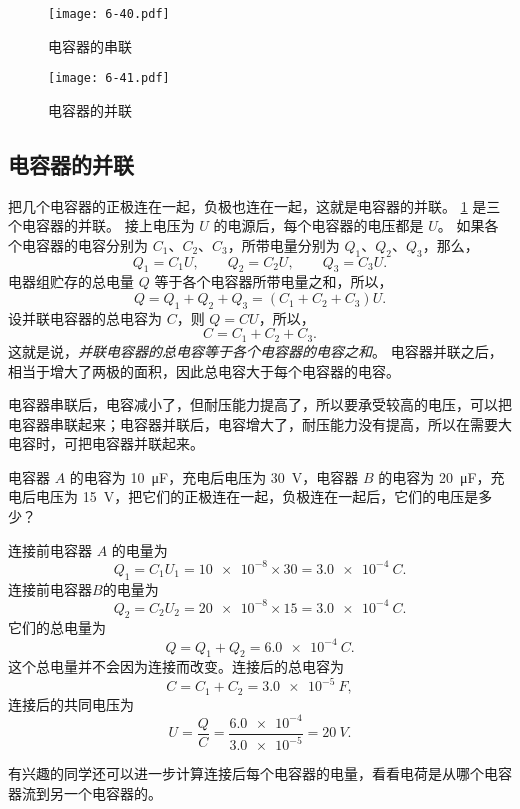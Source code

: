 \begin{figure}
	\begin{minipage}[b]{0.45\linewidth}\centering
		\texttt{[image: 6-40.pdf]}
		\caption{电容器的串联}\label{fig:6-40}
	\end{minipage}
	\begin{minipage}[b]{0.53\linewidth}\centering
		\texttt{[image: 6-41.pdf]}
		\caption{电容器的并联}\label{fig:6-41}
	\end{minipage}
\end{figure}

\subsection{电容器的并联} 
把几个电容器的正极连在一起，负极也连在一起，这就是电容器的并联。
\cref{fig:6-41} 是三个电容器的并联。
接上电压为 $U$ 的电源后，每个电容器的电压都是 $U$。
如果各个电容器的电容分别为 $C_1$、$C_2$、$C_3$，所带电量分别为 $Q_1$、$Q_2$、$Q_3$，那么，
\[Q_1=C_1U,\qquad Q_2=C_2U,\qquad Q_3=C_3U.\]
电器组贮存的总电量 $Q$ 等于各个电容器所带电量之和，所以，
\[Q=Q_1+Q_2+Q_3=(C_1+C_2+C_3)U.\]
设并联电容器的总电容为 $C$，则 $Q=CU$，所以，
\[C=C_1+C_2+C_3.\]
这就是说，\emph{并联电容器的总电容等于各个电容器的电容之和}。
电容器并联之后，相当于增大了两极的面积，因此总电容大于每个电容器的电容。

电容器串联后，电容减小了，但耐压能力提高了，所以要承受较高的电压，可以把电容器串联起来；电容器并联后，电容增大了，耐压能力没有提高，所以在需要大电容时，可把电容器并联起来。

\begin{example}
电容器 $A$ 的电容为 \qty{10}{\micro F}，充电后电压为 \qty{30}{V}，电容器 $B$ 的电容为 \qty{20}{\micro F}，充电后电压为 \qty{15}{V}，把它们的正极连在一起，负极连在一起后，它们的电压是多少？
\end{example}

\begin{solution}
连接前电容器 $A$ 的电量为
\[Q_1=C_1U_1=\num{10e-8}\times 30=\qty{3.0e-4}{C}.\]
连接前电容器$B$的电量为
\[Q_2=C_2U_2=\num{20e-8}\times 15=\qty{3.0e-4}{C}.\]
它们的总电量为
\[Q=Q_1+Q_2=\qty{6.0e-4}{C}.\]
这个总电量并不会因为连接而改变。连接后的总电容为
\[C=C_1+C_2=\qty{3.0e-5}{F},\]
连接后的共同电压为
\[U=\frac{Q}{C}=\frac{\num{6.0e-4}}{\num{3.0e-5}}=\qty{20}{V}.\]
\end{solution}

有兴趣的同学还可以进一步计算连接后每个电容器的电量，看看电荷是从哪个电容器流到另一个电容器的。

